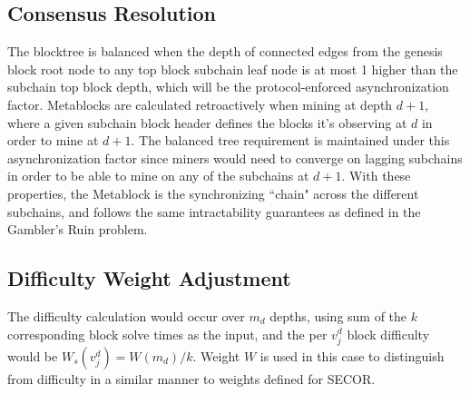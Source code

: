 \documentclass{article}
\begin{document}
\subsection{Consensus Resolution}
The blocktree is balanced when the depth of connected edges from the genesis block root node to any top block subchain leaf node is at most 1 higher than the subchain top block depth, which will be the protocol-enforced asynchronization factor. Metablocks are calculated retroactively when mining at depth $d+1$, where a given subchain block header defines the blocks it's observing at $d$ in order to mine at $d+1$. The balanced tree requirement is maintained under this asynchronization factor since miners would need to converge on lagging subchains in order to be able to mine on any of the subchains at $d+1$. With these properties, the Metablock is the synchronizing ``chain" across the different subchains, and follows the same intractability guarantees as defined in the Gambler's Ruin problem\cite{nakamoto}.
\subsection{Difficulty Weight Adjustment}
The difficulty calculation would occur over $m_d$ depths, using sum of the $k$ corresponding block solve times as the input, and the per $v_j^d$ block difficulty would be $W_s(v_j^d) = W(m_d) / k$. Weight $W$ is used in this case to distinguish from difficulty in a similar manner to weights defined for SECOR\cite{khawaja}.
\end{document}
